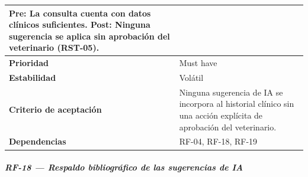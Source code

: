 \documentclass[
]{article}
\begin{document}
{\begin{longtable}[]{|
  >{\raggedright\arraybackslash}p{}|
  >{\raggedright\arraybackslash}p{}|}
\begin{minipage}[t]{\linewidth}
Pre: La consulta cuenta con datos clínicos suficientes. Post: Ninguna sugerencia se aplica sin aprobación del veterinario (RST-05).
\end{minipage} \\
\hline
\textbf{Prioridad} & \begin{minipage}[t]{\linewidth}\raggedright
Must have
\end{minipage} \\
\hline
\textbf{Estabilidad} & \begin{minipage}[t]{\linewidth}\raggedright
Volátil
\end{minipage} \\
\hline
\textbf{Criterio de aceptación} &
\begin{minipage}[t]{\linewidth}\raggedright
Ninguna sugerencia de IA se incorpora al historial clínico sin una acción explícita de aprobación del veterinario.
\end{minipage} \\
\hline
\textbf{Dependencias} & \begin{minipage}[t]{\linewidth}\raggedright
RF-04, RF-18, RF-19
\end{minipage} \\
\hline
\end{longtable}
}

\subparagraph{RF-18 --- Respaldo bibliográfico de las sugerencias de IA}\label{rf-18-respaldo-bibliogr-fico-de-las-sugerencia}
\end{document}
